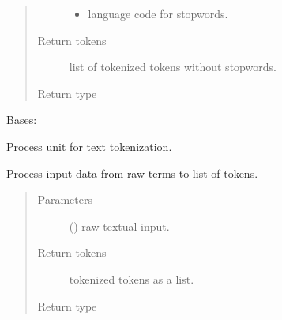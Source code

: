 \documentclass[letterpaper,10pt,english]{sphinxmanual}
\begin{document}
\begin{fulllineitems}
\begin{fulllineitems}
\begin{quote}
\begin{description}
\begin{itemize}
\item {} 
 \textendash{} language code for stopwords.

\end{itemize}

\item[{Return tokens}] \leavevmode
list of tokenized tokens without stopwords.

\item[{Return type}] \leavevmode
{}

\end{description}\end{quote}

\end{fulllineitems}


\end{fulllineitems}


\begin{fulllineitems}
\label{\detokenize{matchzoo:matchzoo.preprocessors.TokenizeUnit}}
Bases: {\hyperref[\detokenize{matchzoo:matchzoo.preprocessors.ProcessorUnit}]{}}

Process unit for text tokenization.

\begin{fulllineitems}
\label{\detokenize{matchzoo:matchzoo.preprocessors.TokenizeUnit.transform}}
Process input data from raw terms to list of tokens.
\begin{quote}\begin{description}
\item[{Parameters}] \leavevmode
{} () \textendash{} raw textual input.

\item[{Return tokens}] \leavevmode
tokenized tokens as a list.

\item[{Return type}] \leavevmode
{}

\end{description}\end{quote}

\end{fulllineitems}


\end{fulllineitems}
\end{document}
